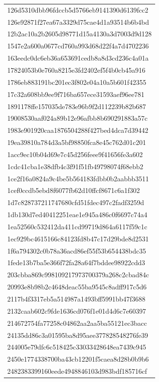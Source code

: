 \begin{tabular}{l}
126d5310dbb96fdccb5d5766eb9141390d6139fcc2 \\
126e92871f27ea67a3329d75cae4d1a93514b6b4bd \\
12b2ac10a2b2605d98771d15a4130a3d7003d9d128 \\
1547e2a600a0677cd760a993d68d22f4a7d4702236 \\
163eedc0dc6eb36a653691cedb8a8d3cd236c4a01a \\
17824053b0e760a8215e3fd2402ef5f4b0cb45a916 \\
1786eb883191bc201ec3f802e04a10a5b601f42355 \\
17c32a608bb9ee9f716ba657ece31593aef96ee781 \\
1891178ffe157035de783e96b9f2d112239b82b687 \\
19008530aaf024a89b12e96afbb8b690291883a57c \\
1983e901920caa1876504288f427bed4dca7d39442 \\
19ea39810a784d3a5bf98850fca8e45c762d01c201 \\
1acc9ec10b04d69e7c45d256feee9f41656fe3a602 \\
1cdc41cba1e38dfb4c3f91f51fb49798074f68ebb2 \\
1ce2f16a0824a9c4be5b564183fdbb0b2aabbb3511 \\
1cef0ccdb5ebd8f6077fb62d10ffcf8671c6a1f302 \\
1d7c828737211747680cfd51fdec497c2fadf3259d \\
1db130d7ed40412251eae1e945a486c0f6697c74a4 \\
1ea52560c532412da411cd99719d864a6117f59c1c \\
1ec929bc4615166c84123fd8b47c17d29bde8d2531 \\
1f6a794302c0b78a36acd86ef55f53b654438bdc35 \\
1fede13b7ba5e366f72fa28a64f7bddee98922cdd3 \\
203cbba869c998109217973700379a268c2cbad84c \\
20993e8b98b2c4648deac55ba9545c8adff917c5d6 \\
2117b4f3317eb5a514987a1493bff5991bb47f3688 \\
2132caab602c9fde1636cd076f1e01d4d6c7e60397 \\
214672754fa77258c04862aa2aa5ba55121ec3bacc \\
24135dd86c3a01595ba8d95aee377828548276fe39 \\
244005e79dfc6c518425c33033428648ea7439c945 \\
2450e1774338700ba43cb12201f5caea8d28b0b9b6 \\
2482383399160eede4948846103d983bdf185716cf \\

\end{tabular}
